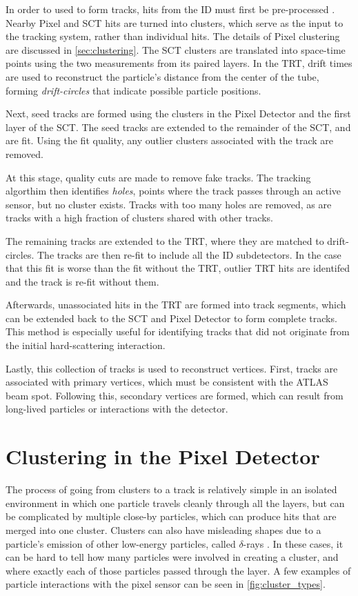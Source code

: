 In order to used to form tracks, hits from the \ac{ID} must first be pre-processed \cite{ATL-PHYS-PUB-2009-002}. Nearby Pixel and \ac{SCT} hits are turned into clusters, which serve as the input to the tracking system, rather than individual hits. The details of Pixel clustering are discussed in \autoref{sec:clustering}. The \ac{SCT} clusters are translated into space-time points using the two measurements from its paired layers. In the \ac{TRT}, drift times are used to reconstruct the particle's distance from the center of the tube, forming \textit{drift-circles} that indicate possible particle positions. 

Next, seed tracks are formed using the clusters in the Pixel Detector and the first layer of the \ac{SCT}. The seed tracks are extended to the remainder of the \ac{SCT}, and are fit. Using the fit quality, any outlier clusters associated with the track are removed. 

At this stage, quality cuts are made to remove fake tracks. The tracking algorthim then identifies \textit{holes}, points where the track passes through an active sensor, but no cluster exists. Tracks with too many holes are removed, as are tracks with a high fraction of clusters shared with other tracks. 

The remaining tracks are extended to the \ac{TRT}, where they are matched to drift-circles. The tracks are then re-fit to include all the \ac{ID} subdetectors. In the case that this fit is worse than the fit without the \ac{TRT}, outlier \ac{TRT} hits are identifed and the track is re-fit without them. 

Afterwards, unassociated hits in the \ac{TRT} are formed into track segments, which can be extended back to the \ac{SCT} and Pixel Detector to form complete tracks. This method is especially useful for identifying tracks that did not originate from the initial hard-scattering interaction.

Lastly, this collection of tracks is used to reconstruct vertices. First, tracks are associated with primary vertices, which must be consistent with the \ac{ATLAS} beam spot. Following this, secondary vertices are formed, which can result from long-lived particles or interactions with the detector.

\section{Clustering in the Pixel Detector}
\label{sec:clustering}

The process of going from clusters to a track is relatively simple in an isolated environment in which one particle travels cleanly through all the layers, but can be complicated by multiple close-by particles, which can produce hits that are merged into one cluster. Clusters can also have misleading shapes due to a particle's emission of other low-energy particles, called $\delta$-rays \cite{PERF-2012-05}. In these cases, it can be hard to tell how many particles were involved in creating a cluster, and where exactly each of those particles passed through the layer. A few examples of particle interactions with the pixel sensor can be seen in \autoref{fig:cluster_types}. 

